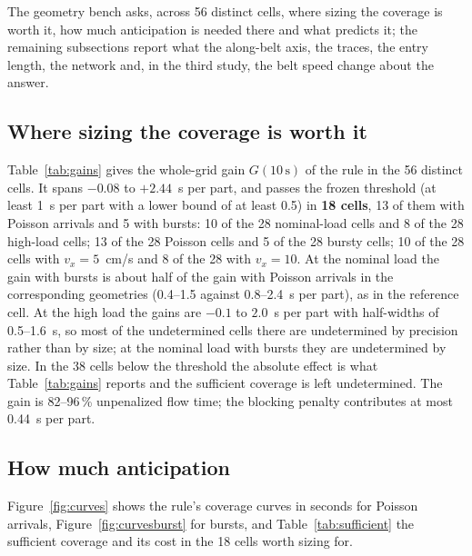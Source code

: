\documentclass[11pt,a4paper]{article}
\newcommand{\nj}{\textsc{nj}}
\newcommand{\tcross}{\tau_{\mathrm{cross}}}
\begin{document}
The geometry bench asks, across 56 distinct cells, where sizing the coverage is worth it, how much anticipation is needed there and what predicts it; the remaining subsections report what the along-belt axis, the traces, the entry length, the network and, in the third study, the belt speed change about the answer.

\subsection{Where sizing the coverage is worth it}\label{sec:worth}
Table~\ref{tab:gains} gives the whole-grid gain $G(10\,\mathrm{s})$ of the rule in the 56
distinct cells. It spans $-0.08$ to $+2.44$~s per part, and passes the frozen threshold
(at least 1~s per part with a lower bound of at least 0.5) in \textbf{18 cells}, 13 of them
with Poisson arrivals and 5 with bursts: 10 of the 28 nominal-load cells and 8 of the 28
high-load cells; 13 of the 28 Poisson cells and 5 of the 28 bursty cells; 10 of the 28
cells with $v_x=5$~cm/s and 8 of the 28 with $v_x=10$. At the nominal load the gain with bursts is about half of the gain with Poisson
arrivals in the corresponding geometries (0.4--1.5 against 0.8--2.4~s per part), as in
the reference cell. At the high load the gains are $-0.1$ to $2.0$~s per part with half-widths of
0.5--1.6~s, so most of the undetermined cells there are undetermined by precision rather
than by size; at the nominal load with bursts they are undetermined by size. In the 38
cells below the threshold the absolute effect is what Table~\ref{tab:gains} reports and
the sufficient coverage is left undetermined. The gain is 82--96\,\% unpenalized flow
time; the blocking penalty contributes at most 0.44~s per part.

\begin{table}[t]
\centering\small
\caption{Geometry bench, \nj: gain of pre-positioning with the whole grid,
$G(10\,\mathrm{s})=J_{\mathrm{none}}-J_{\mathrm{when\_idle}}$ at 10~s of anticipation
[s per part], paired over 60 realizations, 95\,\% CI. Columns: the seven distinct
crossing times with the geometry that realizes them (cells with the same $\tcross$ are
identical, check (iv)). Bold: worth sizing the coverage for ($G\ge1$~s per part, lower
bound $\ge0.5$).}
\label{tab:gains}
\resizebox{\linewidth}{!}{}
\end{table}

\subsection{How much anticipation}\label{sec:howmuch}
Figure~\ref{fig:curves} shows the rule's coverage curves in seconds for Poisson arrivals,
Figure~\ref{fig:curvesburst} for bursts, and Table~\ref{tab:sufficient} the sufficient
coverage and its cost in the 18 cells worth sizing for.
\end{document}
